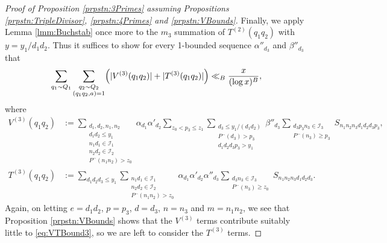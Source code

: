 \documentclass[10pt]{amsart}
\theoremstyle{plain}
\numberwithin{equation}{section}
\begin{document}
\begin{proof}[Proof of Proposition \ref{prpstn:3Primes} assuming Propositions \ref{prpstn:TripleDivisor}, \ref{prpstn:4Primes} and \ref{prpstn:VBounds}]
Finally, we apply Lemma \ref{lmm:Buchstab} once more to the $m_3$ summation of $T^{(2)}(q_1q_2)$ with $y=y_1/d_1d_2$. Thus it suffices to show for every 1-bounded sequence $\alpha''_{d_3}$ and $\beta''_{d_3}$ that
\begin{equation}
\sum_{q_1\sim Q_1}\sum_{\substack{ q_2\sim Q_2\\ (q_1q_2,a)=1}}\Bigl(|V^{(3)}(q_1q_2)|+|T^{(3)}(q_1q_2)|\Bigr)\ll_B\frac{x}{(\log{x})^B},
\label{eq:VTBound3}
\end{equation}
where
\begin{align*}
V^{(3)}(q_1q_2)&:=\sum_{\substack{d_1,d_2,n_1,n_2\\ d_1d_2\le y_1\\ n_1d_1\in\mathcal{I}_1\\ n_2d_2\in\mathcal{I}_2\\ P^-(n_1n_2)>z_0}}\alpha_{d_1}\alpha'_{d_2}\sum_{z_0<p_3\le z_1}\sum_{\substack{d_3\le y_1/(d_1d_2)\\ P^-(d_3)>p_3\\ d_1 d_2 d_3 p_3>y_1}}\beta''_{d_3}\sum_{\substack{d_3 p_3 n_3\in \mathcal{I}_3\\ P^-(n_3)\ge p_3}}S_{n_1n_2n_3d_1d_2d_3 p_3},\\
T^{(3)}(q_1q_2)&:=\sum_{d_1d_2d_3\le y_1}\sum_{\substack{n_1d_1\in\mathcal{I}_1\\ n_2d_2\in\mathcal{I}_2\\ P^-(n_1n_2)>z_0}}\alpha_{d_1}\alpha'_{d_2}\alpha''_{d_3}\sum_{\substack{d_3 n_3\in \mathcal{I}_3\\ P^-(n_3)\ge z_0}}S_{n_1 n_2 n_3 d_1 d_2 d_3}.
\end{align*}
Again, on letting $e=d_1d_2$, $p=p_3$, $d=d_3$, $n=n_3$ and $m=n_1n_2$, we see that Proposition \ref{prpstn:VBounds} shows that the $V^{(3)}$ terms contribute suitably little to \eqref{eq:VTBound3}, so we are left to consider the $T^{(3)}$ terms.


\end{proof}
\end{document}
